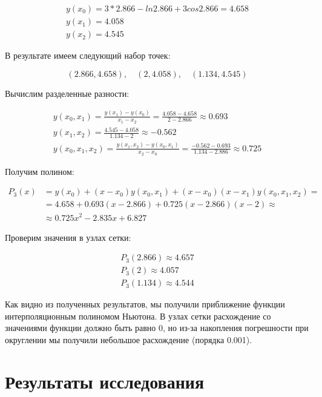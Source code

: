 \documentclass{article}
\begin{document}
\begin{gather}
y(x_0) = 3 * 2.866 - ln 2.866 + 3 cos 2.866 = 4.658 \nonumber \\
y(x_1) = 4.058 \nonumber \\
y(x_2) = 4.545
\end{gather}

В результате имеем следующий набор точек:

\begin{equation}
(2.866, 4.658), \quad (2, 4.058), \quad (1.134, 4.545)
\end{equation}

Вычислим разделенные разности:

\begin{gather}
y(x_0, x_1) = \frac{y(x_1) - y(x_0)}{x_1 - x_2} = \frac{4.058 - 4.658}{2 - 2.866} \approx 0.693 \nonumber \\
y(x_1, x_2) = \frac{4.545 - 4.058}{1.134 - 2} \approx -0.562 \nonumber \\
y(x_0, x_1, x_2) = \frac{y(x_1, x_2) - y(x_0, x_1)}{x_2 - x_0} = \frac{-0.562 - 0.693}{1.134 - 2.886} \approx 0.725
\end{gather}

Получим полином:

\begin{align}
P_3(x) &= y(x_0) + (x - x_0)y(x_0, x_1) + (x - x_0)(x - x_1)y(x_0, x_1, x_2) = \nonumber \\
        &= 4.658 + 0.693(x - 2.866) + 0.725(x - 2.866)(x - 2) \approx \nonumber \\
        &\approx 0.725x^2 - 2.835x + 6.827
\end{align}

Проверим значения в узлах сетки:

\begin{gather}
P_3(2.866) \approx 4.657 \nonumber \\
P_3(2) \approx 4.057 \nonumber \\
P_3(1.134) \approx 4.544
\end{gather}

Как видно из полученных результатов, мы получили приближение функции интерполяционным полиномом Ньютона. В узлах сетки расхождение со значениями функции должно быть равно 0, но из-за накопления погрешности при округлении мы получили небольшое расхождение (порядка 0.001).

\section{Результаты исследования}
\end{document}
